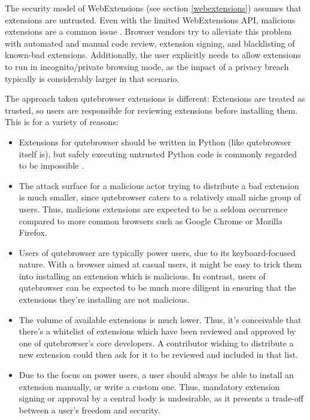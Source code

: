 \documentclass[a4paper,parskip=full]{scrreprt}
\begin{document}
The security model of WebExtensions (see section \ref{webextensions}) assumes
that extensions are untrusted. Even with the limited WebExtensions API,
malicious extensions are a common issue
\autocite{mozilla-signing,mozilla-trustworthy}. Browser vendors try to alleviate
this problem with automated and manual code review, extension signing, and
blacklisting of known-bad extensions. Additionally, the user explicitly needs to
allow extensions to run in incognito/private browsing mode, as the impact of a
privacy breach typically is considerably larger in that scenario.

The approach taken qutebrowser extensions is different: Extensions are treated
as trusted, so users are responsible for reviewing extensions before installing
them. This is for a variety of reasons:

\begin{itemize}
  \item Extensions for qutebrowser should be written in Python (like qutebrowser itself
    is), but safely executing untrusted Python code is commonly regarded to be
    impossible \autocite{nedbat-eval, lwn-pysandbox}.
  \item The attack surface for a malicious actor trying to distribute a bad
    extension is much smaller, since qutebrowser caters to a relatively small
    niche group of users. Thus, malicious extensions are expected to be a seldom
    occurrence compared to more common browsers such as Google Chrome or Mozilla
    Firefox.
  \item Users of qutebrowser are typically power users, due to its
    keyboard-focused nature. With a browser aimed at casual users, it might be
    easy to trick them into installing an extension which is malicious. In
    contrast, users of qutebrowser can be expected to be much more diligent in ensuring that
    the extensions they're installing are not malicious.
  \item The volume of available extensions is much lower. Thus, it's conceivable
    that there's a whitelist of extensions which have been reviewed and approved
    by one of qutebrowser's core developers. A contributor wishing to distribute
    a new extension could then ask for it to be reviewed and included in that list.
  \item Due to the focus on power users, a user should always be able to
    install an extension manually, or write a custom one. Thus, mandatory
    extension signing or approval by a central body is undesirable, as it
    presents a trade-off between a user's freedom and security.
\end{itemize}
\end{document}

